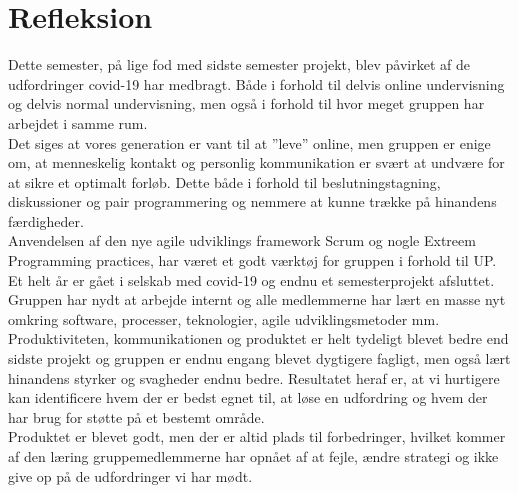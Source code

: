 \chapter{Refleksion}\label{ch:refleksion}
Dette semester, på lige fod med sidste semester projekt, blev påvirket af de udfordringer covid-19 har medbragt.
Både i forhold til delvis online undervisning og delvis normal undervisning, 
men også i forhold til hvor meget gruppen har arbejdet i samme rum. \\

Det siges at vores generation er vant til at ”leve” online, men gruppen er enige om, 
at menneskelig kontakt og personlig kommunikation er svært at undvære for at sikre et optimalt forløb. 
Dette både i forhold til beslutningstagning, diskussioner og pair programmering og 
nemmere at kunne trække på hinandens færdigheder. \\

Anvendelsen af den nye agile udviklings framework Scrum og nogle Extreem Programming practices, 
har været et godt værktøj for gruppen i forhold til UP. \\

Et helt år er gået i selskab med covid-19 og endnu et semesterprojekt afsluttet. 
Gruppen har nydt at arbejde internt og alle medlemmerne har lært en masse nyt 
omkring software, processer, teknologier, agile udviklingsmetoder mm. \\

Produktiviteten, kommunikationen og produktet er helt tydeligt blevet bedre end sidste 
projekt og gruppen er endnu engang blevet dygtigere fagligt, 
men også lært hinandens styrker og svagheder endnu bedre. Resultatet heraf er, 
at vi hurtigere kan identificere hvem der er bedst egnet til, 
at løse en udfordring og hvem der har brug for støtte på et bestemt område. \\

Produktet er blevet godt, men der er altid plads til forbedringer, 
hvilket kommer af den læring gruppemedlemmerne har opnået af at fejle, 
ændre strategi og ikke give op på de udfordringer vi har mødt.
